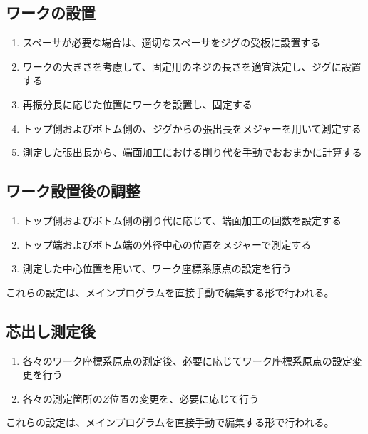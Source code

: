 \subsection{ワークの設置}
\begin{enumerate}
\item スペーサが必要な場合は、適切なスペーサをジグの受板に設置する
\item ワークの大きさを考慮して、固定用のネジの長さを適宜決定し、ジグに設置する
\item 再振分長に応じた位置にワークを設置し、固定する
\item トップ側およびボトム側の、ジグからの張出長をメジャーを用いて測定する
\item 測定した張出長から、端面加工における削り代を手動でおおまかに計算する
\end{enumerate}


\subsection{ワーク設置後の調整}
\begin{enumerate}
\item トップ側およびボトム側の削り代に応じて、端面加工の回数を設定する
\item トップ端およびボトム端の外径中心の位置をメジャーで測定する
\item 測定した中心位置を用いて、ワーク座標系原点の設定を行う
\end{enumerate}
これらの設定は、メインプログラムを直接手動で編集する形で行われる。



\clearpage


\subsection{芯出し測定後}
\begin{enumerate}
\item 各々のワーク座標系原点の測定後、必要に応じてワーク座標系原点の設定変更を行う
\item 各々の測定箇所の$Z$位置の変更を、必要に応じて行う
\end{enumerate}
これらの設定は、メインプログラムを直接手動で編集する形で行われる。


